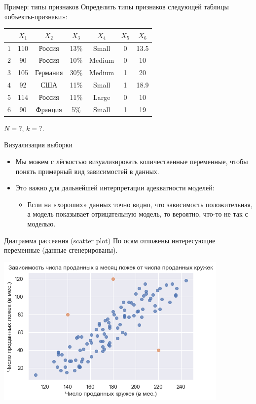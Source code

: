 \documentclass[c, handout]{beamer} %
\begin{document}
	\begin{frame}{Пример: типы признаков}
		Определить типы признаков следующей таблицы «объекты-признаки»:
		\begin{center}
			\def\arraystretch{1.5}
			\begin{tabular}{l| c c c c c c}
				\hline
				& $X_1$ & $X_2$ & $X_3$  & $X_4$ & $X_5$ & $X_6$ \\
				\hline
				$1$ & 110 & Россия & 13\% & Small & 0 & 13.5  \\
				$2$ & 90 & Россия & 10\% & Medium & 0 & 10  \\
				$3$ & 105 & Германия & 30\% & Medium & 1 & 20  \\
				$4$ & 92 & США & 11\% & Small & 1 & 18.9  \\
				$5$ & 114 & Россия & 11\% & Large & 0 & 10  \\
				$6$ & 90 & Франция & 5\% & Small & 1 & 19  \\
			\end{tabular}
		\end{center}
		$N =?$, $k = ?$.
	\end{frame}

	\begin{frame}{Визуализация выборки}
		\begin{itemize}\setlength\itemsep{1em}
			\item Мы можем с лёгкостью визуализировать количественные переменные, чтобы понять примерный вид зависимостей в данных. 
			\item Это важно для дальнейшей интерпретации адекватности моделей:
				\begin{itemize}
					\item Если на «хороших» данных точно видно, что зависимость положительная, а модель показывает отрицательную модель, то вероятно, что-то не так с моделью. 
				\end{itemize} 
		\end{itemize}
	\end{frame}

	\begin{frame}{Диаграмма рассеяния (scatter plot)}
		По осям отложены интересующие переменные (данные сгенерированы).
		\begin{center}
		\includegraphics[width = 0.8\linewidth]{1.png}
		\end{center}
	\end{frame}
\end{document}
